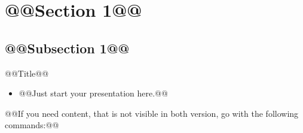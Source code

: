 
\begin{frame}
  \tableofcontents
\end{frame}

\section{@@Section 1@@}
\subsection{@@Subsection 1@@}
\begin{frame}{@@Title@@}
  \begin{itemize}
    \item @@Just start your presentation here.@@
  \end{itemize}
  
  @@If you need content, that is not visible in both version, go with the 
  following commands:@@
  
\end{frame}

